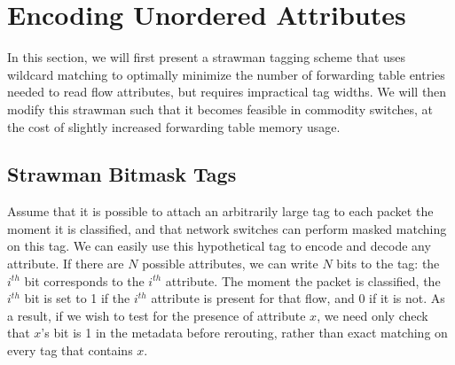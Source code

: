 \section{Encoding Unordered Attributes} 
\label{sec:flextag_encoding} 
In this section, we will first present a strawman tagging scheme that uses
wildcard matching to optimally minimize the number of forwarding table
entries needed to read flow attributes, but requires impractical tag widths. 
We will then modify this strawman
such that it becomes feasible in commodity switches, at the cost
of slightly increased forwarding table memory usage.



\subsection{Strawman Bitmask Tags}
\label{ssec:bitmasks}
Assume that it is possible to attach an arbitrarily
large tag to each packet the moment it is classified, and that network switches
can perform masked matching on this tag.
We can easily use this hypothetical tag to encode and decode 
any attribute. If there are $N$ possible attributes, we can write $N$ bits to
the tag: the $i^{th}$ bit corresponds to the $i^{th}$ attribute. The moment
the packet is classified, the $i^{th}$ bit is set to 1 if the $i^{th}$ attribute
is present for that flow, and 0 if it is not. As a result, if we wish to test for
the presence of attribute $x$, we need only check that $x$'s bit is 1 in the
metadata before rerouting, rather than exact matching on every tag that contains
$x$.

